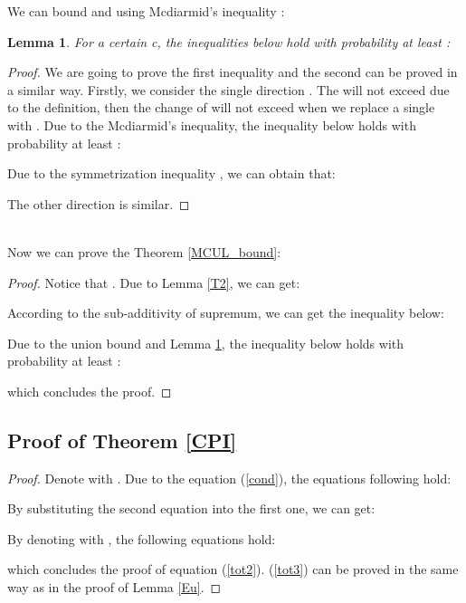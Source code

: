\documentclass[]{article} \usepackage{geometry}
\newtheorem{lemma}[theorem]{Lemma}
\begin{document}
We can bound  and  using Mcdiarmid's inequality \cite{Mc}:
\begin{lemma}\label{L9}For a certain c, the inequalities below hold with probability at least :

\end{lemma}
\begin{proof}
We are going to prove the first inequality and the second can be proved in a similar way. Firstly, we consider the single direction . The  will not exceed  due to the definition, then
the change of  will not exceed  when we replace a single  with . Due to the Mcdiarmid's inequality, the inequality below holds with probability at least :

Due to the symmetrization inequality \cite{foundation}, we can obtain that:

The other direction is similar.
\end{proof}
~\\

Now we can prove the Theorem \ref{MCUL_bound}:
\begin{proof}
Notice that . Due to Lemma \ref{T2}, we can get:

 According to the sub-additivity of supremum, we can get the inequality below:


Due to the union bound and Lemma \ref{L9}, the inequality below holds with probability at least : 

which concludes the proof.
\end{proof}

\subsection*{{Proof of Theorem \ref{CPI}}}
\label{AC}
\begin{proof}
\rm Denote  with . Due to the equation (\ref{cond}), the equations following hold:

By substituting the second equation into the first one, we can get:

By denoting  with , the following equations hold:

which concludes the proof of equation (\ref{tot2}). (\ref{tot3}) can be proved in the same way as in the proof of Lemma \ref{Eu}.
\end{proof}
\end{document}
